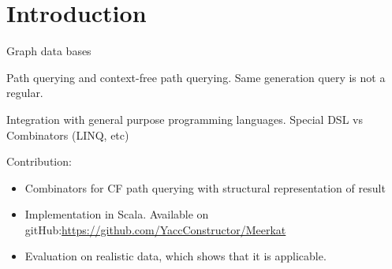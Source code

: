 \section{Introduction}

Graph data bases

Path querying and context-free path querying.
Same generation query is not a regular.

Integration with general purpose programming languages.
Special DSL vs Combinators (LINQ, etc)~\cite{ScalaGraphParsing}

Contribution:
\begin{itemize}
\item Combinators for CF path querying with structural representation of result
\item Implementation in Scala. Available on gitHub:\url{https://github.com/YaccConstructor/Meerkat}
\item Evaluation on realistic data, which shows that it is applicable.
\end{itemize}